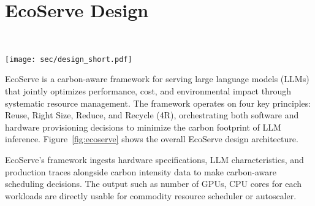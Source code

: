\section{EcoServe Design}~\label{sec:ecoserve}
\begin{figure*}[t]
\centering     \texttt{[image: sec/design\_short.pdf]} 
\vspace{-1em}
    \caption{EcoServe system diagram: An optimization framework that minimizes operational and embodied carbon across hardware resources through 4R co-designed strategies. Outputs inform scheduling and resource allocation decisions. }\label{fig:ecoserve}
    \vspace{-1em}
\end{figure*}
EcoServe is a carbon-aware framework for serving large language models (LLMs) that jointly optimizes performance, cost, and environmental impact through systematic resource management. The framework operates on four key principles: Reuse, Right Size, Reduce, and Recycle (4R), orchestrating both software and hardware provisioning decisions to minimize the carbon footprint of LLM inference. Figure~\ref{fig:ecoserve} shows the overall EcoServe design architecture.

EcoServe's framework ingests hardware specifications, LLM characteristics, and production traces alongside carbon intensity data to make carbon-aware scheduling decisions. The output such as number of GPUs, CPU cores for each workloads are directly usable for commodity resource scheduler or autoscaler. 

